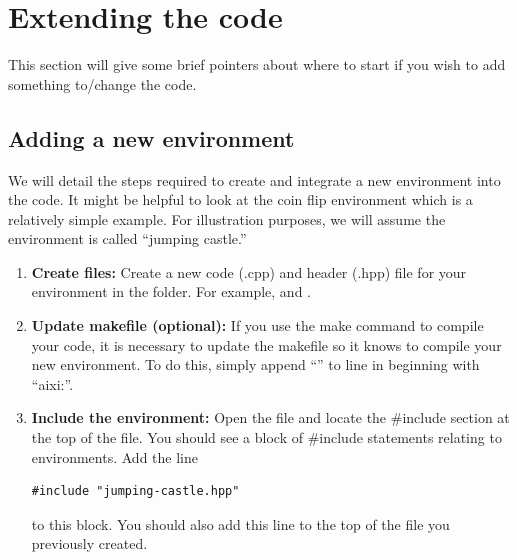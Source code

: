 \documentclass[a4paper,11pt]{article}
\begin{document}
\section{Extending the code}
This section will give some brief pointers about where to start if you wish to add something to/change the code.

\subsection{Adding a new environment}
We will detail the steps required to create and integrate a new environment into the code. It might be helpful to look at the coin flip environment which is a relatively simple example. For illustration purposes, we will assume the environment is called ``jumping castle.''
\begin{enumerate}
\item {\bf Create files:} Create a new code (.cpp) and header (.hpp) file for your environment in the  folder. For example,  and .

\item {\bf Update makefile (optional):} If you use the make command to compile your code, it is necessary to update the makefile so it knows to compile your new environment. To do this, simply append ``'' to line in  beginning with ``aixi:''.

\item {\bf Include the environment:} Open the file  and locate the \#include section at the top of the file. You should see a block of \#include statements relating to environments. Add the line
  \lstset{language=c++}
  \begin{lstlisting}[frame=single]
#include "jumping-castle.hpp"
  \end{lstlisting}
  to this block. You should also add this line to the top of the  file you previously created.


\end{enumerate}
\end{document}
